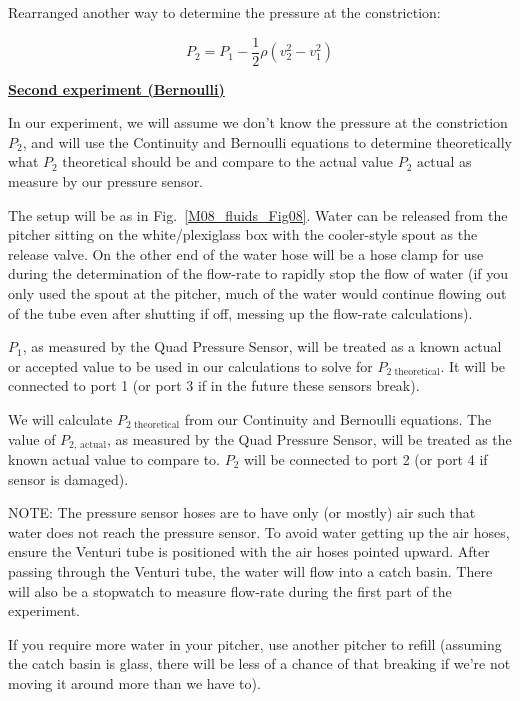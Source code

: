 Rearranged another way to determine the pressure at the constriction:

\begin{equation}
\label{M08_fluids_Eq08}
    P_2 = P_1 - \frac{1}{2}\rho (v_{2}^2 - v_{1}^2)
\end{equation}


\underline{\textbf{Second experiment (Bernoulli)}}

In our experiment, we will assume we don't know the pressure at the constriction $P_2$, and will use the Continuity and Bernoulli equations to determine theoretically what $P_2\text{ theoretical}$ should be and compare to the actual value $P_2\text{ actual}$ as measure by our pressure sensor.

The setup will be as in Fig.~\ref{M08_fluids_Fig08}. Water can be released from the pitcher sitting on the white/plexiglass box with the cooler-style spout as the release valve. On the other end of the water hose will be a hose clamp for use during the determination of the flow-rate to rapidly stop the flow of water (if you only used the spout at the pitcher, much of the water would continue flowing out of the tube even after shutting if off, messing up the flow-rate calculations). 

$P_1$, as measured by the Quad Pressure Sensor, will be treated as a known actual or accepted value to be used in our calculations to solve for $P_{2\text{ theoretical}}$. It will be connected to port 1 (or port 3 if in the future these sensors break). 

We will calculate $P_{2\text{ theoretical}}$ from our Continuity and Bernoulli equations. The value of $P_{2\text{, actual}}$, as measured by the Quad Pressure Sensor, will be treated as the known actual value to compare to. $P_2$ will be connected to port 2 (or port 4 if sensor is damaged). 

NOTE: The pressure sensor hoses are to have only (or mostly) air such that water does not reach the pressure sensor. To avoid water getting up the air hoses, ensure the Venturi tube is positioned with the air hoses pointed upward. After passing through the Venturi tube, the water will flow into a catch basin. There will also be a stopwatch to measure flow-rate during the first part of the experiment.

If you require more water in your pitcher, use another pitcher to refill (assuming the catch basin is glass, there will be less of a chance of that breaking if we're not moving it around more than we have to).





